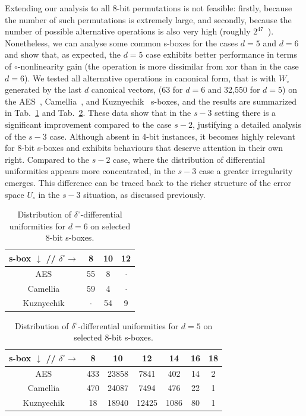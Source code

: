 \documentclass[runningheads,a4paper,english]{llncs}
\begin{document}
Extending our analysis to all 8-bit permutations is not feasible: firstly, because the number of such permutations is extremely large, and secondly, because the number of possible alternative operations is also very high (roughly $2^{47}$~\cite{civino2025classificationsmallbinarybibraces}). Nonetheless, we can analyse  some common s-boxes for the cases $d=5$ and $d=6$ and show that, as expected, the $d=5$ case exhibits better performance in terms of $\circ$-nonlinearity gain (the operation is more dissimilar from xor than in the case $d=6$). We tested all alternative operations in canonical form, that is with $W_\circ$ generated by the last $d$ canonical vectors, (63 for $d=6$ and 32,550 for $d=5$) on the AES~\cite{daemen2002design}, Camellia~\cite{aoki2000camellia}, and Kuznyechik~\cite{biryukov2016reverse} s-boxes, and the results are summarized in Tab.~\ref{tab:common-d6} and Tab.~\ref{tab:common-d5}. These data show that in the $s-3$ setting there is a significant improvement compared to the case $s-2$, justifying a detailed analysis of the $s-3$ case. Although absent in 4-bit instances, it becomes highly relevant for 8-bit s-boxes and exhibits behaviours that deserve attention in their own right. Compared to the $s-2$ case, where the distribution of differential uniformities appears more concentrated, in the $s-3$ case a greater irregularity emerges. This difference can be traced back to the richer structure of the error space $U_\circ$ in the $s-3$ situation, as discussed previously.\\ 

\begin{table}[h!]
\centering
\begin{tabular}{c||c|c|c|}
s-box $\downarrow$ // $\delta^\circ \rightarrow$ & 8 & 10 & 12 \\
\hline\hline
AES        & 55 & 8  & $\cdot$ \\
\hline
Camellia   & 59 & 4  & $\cdot$ \\
\hline
Kuznyechik &   $\cdot$ & 54 & 9 \\
\hline
\end{tabular}
\vspace{2mm} 
\label{tab:common-d6}
\caption{Distribution of $\delta^\circ$-differential uniformities for $d=6$ on selected 8-bit s-boxes.}
\end{table}

\begin{table}[h!]
\centering
\begin{tabular}{c||c|c|c|c|c|c|}
s-box $\downarrow$ // $\delta^\circ \rightarrow$ & 8 & 10 & 12 & 14 & 16 & 18 \\
\hline\hline
AES        & 433 & 23858 & 7841 & 402 & 14 & 2 \\
\hline
Camellia   & 470 & 24087 & 7494 & 476 & 22 & 1 \\
\hline
Kuznyechik & 18 & 18940 & 12425 & 1086 & 80 & 1 \\
\hline
\end{tabular}
\vspace{2mm} 
\label{tab:common-d5}
\caption{Distribution of $\delta^\circ$-differential uniformities for $d=5$ on selected 8-bit s-boxes.}
\end{table}
\end{document}
